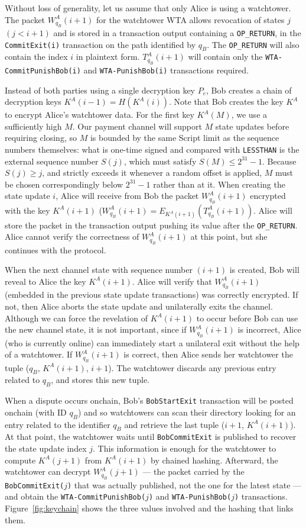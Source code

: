 \documentclass[11pt,a4paper]{article}
\newcommand{\txname}[1]{\texttt{#1}}
\newcommand{\opc}[1]{\texttt{#1}} %
\begin{document}
Without loss of generality, let us assume that only Alice is using a watchtower. The packet $W^A_{q_B}(i+1)$ for the watchtower WTA allows revocation of states $j$ $(j < i+1)$ and is stored in a transaction output containing a  \txname{OP\_RETURN}, in the \txname{CommitExit(i)} transaction on the path identified by $q_B$. The \txname{OP\_RETURN} will also contain the index $i$ in plaintext form. $T^A_{q_B}(i+1)$ will contain only the \txname{WTA-CommitPunishBob(i)} and \txname{WTA-PunishBob(i)} transactions required.

Instead of both parties using a single decryption key $P_e$, Bob creates a chain of decryption keys $K^A(i-1)=H(K^A(i))$. Note that Bob creates the key $K^A$ to encrypt Alice’s watchtower data. For the first key $K^A(M)$, we use a sufficiently high $M$. Our payment channel will support $M$ state updates before requiring closing, so $M$ is bounded by the same Script limit as the sequence numbers themselves: what is one-time signed and compared with \opc{LESSTHAN} is the external sequence number $S(j)$, which must satisfy $S(M) \leq 2^{31}-1$. Because $S(j) \geq j$, and strictly exceeds it whenever a random offset is applied, $M$ must be chosen correspondingly below $2^{31}-1$ rather than at it. When creating the state update $i$, Alice will receive from Bob the packet $W^A_{q_B}(i+1)$ encrypted with the key $K^A(i+1)$ ($W^A_{q_B}(i+1) =  E_{K^A(i+1)}( T^A_{q_B}(i+1))$. Alice will store the packet in the transaction output pushing its value after the \txname{OP\_RETURN}. Alice cannot verify the correctness of $W^A_{q_B}(i+1)$ at this point, but she continues with the protocol.

When the next channel state with sequence number $(i+1)$ is created, Bob will reveal to Alice the key $K^A(i+1)$. Alice will verify that $W^A_{q_B}(i+1)$ (embedded in the previous state update transactions) was correctly encrypted. If not, then Alice aborts the state update and unilaterally exits the channel. Although we can force the revelation of $K^A(i+1)$ to occur before Bob can use the new channel state, it is not important, since if $W^A_{q_B}(i+1)$ is incorrect, Alice (who is currently online) can immediately start a unilateral exit without the help of a watchtower. 
If $W^A_{q_B}(i+1)$ is correct, then Alice sends her watchtower the tuple ($q_B$, $K^A(i+1)$, $i+1$). The watchtower discards any previous entry related to $q_B$, and stores this new tuple. 

When a dispute occurs onchain, Bob's \txname{BobStartExit} transaction will be posted onchain (with ID $q_B$) and so watchtowers can scan their directory looking for an entry related to the identifier $q_B$ and retrieve the last tuple ($i+1$, $K^A(i+1)$). At that point, the watchtower waits until \txname{BobCommitExit} is published to recover the state update index $j$. This information is enough for the watchtower to compute $K^A(j+1)$ from $K^A(i+1)$ by chained hashing. Afterward, the watchtower can decrypt $W^A_{q_B}(j+1)$ --- the packet carried by the \txname{BobCommitExit($j$)} that was actually published, not the one for the latest state --- and obtain the \txname{WTA-CommitPunishBob($j$)} and \txname{WTA-PunishBob($j$)} transactions. Figure~\ref{fig:keychain} shows the three values involved and the hashing that links them.
\end{document}
